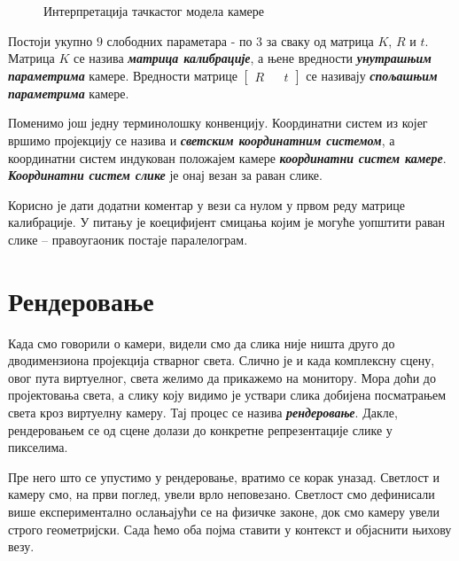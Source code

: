 \documentclass[12pt, a4paper, twoside]{book}
\numberwithin{equation}{chapter}
\numberwithin{theorem}{section}
\numberwithin{definition}{section}
\numberwithin{definitionChapter}{chapter}
\begin{document}
\begin{figure}[H]
\begin{center}
		\end{center}
		\caption{Интерпретација тачкастог модела камере}
		\label{fig-pinhole}
	\end{figure}
	
	Постоји укупно $9$ слободних параметара - по $3$ за сваку од матрица $K$, $R$ и $t$.
	Матрица $K$ се назива \textbf{\textit{матрица калибрације}}, а њене вредности \textbf{\textit{унутрашњим параметрима}}
	камере. Вредности матрице $\begin{bmatrix}R && t\end{bmatrix}$ се називају \textbf{\textit{спољашњим параметрима}}
	камере.
	
	Поменимо још једну терминолошку конвенцију. Координатни систем из којег вршимо пројекцију се 
	назива и \textbf{\textit{светским координатним системом}}, а координатни систем индукован положајем
	камере \textbf{\textit{координатни систем камере}}. \textbf{\textit{Координатни систем слике}} је
	онај везан за раван слике.

	Корисно је дати додатни коментар у вези са нулом у првом реду матрице калибрације. У питању је коецифијент
	смицања којим је могуће уопштити раван слике -- правоугаоник постаје паралелограм.

\section{Рендеровање}
Када смо говорили о камери, видели смо да слика није ништа друго до дводимензиона пројекција стварног света.
Слично је и када комплексну сцену, овог пута виртуелног, света желимо да прикажемо на монитору. Мора доћи
до пројектовања света, а слику коју видимо је уствари слика добијена посматрањем света кроз виртуелну камеру.
Тај процес се назива \textbf{\textit{рендеровање}}. Дакле, рендеровањем се од сцене долази до конкретне
репрезентације слике у пикселима.

Пре него што се упустимо у рендеровање, вратимо се корак уназад. Светлост и камеру смо, на први поглед, увели
врло неповезано. Светлост смо дефинисали више експериментално ослањајући се на физичке законе, док смо камеру
увели строго геометријски. Сада ћемо оба појма ставити у контекст и објаснити њихову везу.
\end{document}
